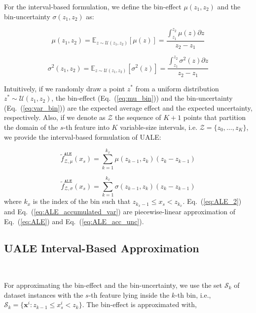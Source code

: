 \documentclass[twoside]{article}
\begin{document}
For the interval-based formulation, we define the bin-effect
\(\mu(z_1, z_2)\) and the bin-uncertainty \(\sigma(z_1, z_2)\) as:

\begin{equation}
  \label{eq:mu_bin}
    \mu(z_1, z_2) = \mathbb{E}_{z \sim \mathcal{U}(z_1,z_2)} [\mu(z)]
    = \frac{\int_{z_1}^{z_2} \mu(z) \partial z}{z_2 - z_1}
\end{equation}

\begin{equation}
  \label{eq:var_bin}
  \sigma^2(z_1, z_2) = \mathbb{E}_{z \sim \mathcal{U}(z_1,z_2)} [\sigma^2(z)] =  \frac{\int_{z_1}^{z_2} \sigma^2(z)  \partial z}{z_2 - z_1}
\end{equation}

%
Intuitively, if we randomly draw a point \(z^*\) from a uniform
distribution \(z^* \sim \mathcal{U}(z_1, z_2)\), the bin-effect
(Eq.~(\ref{eq:mu_bin})) and the bin-uncertainty
(Eq.~(\ref{eq:var_bin})) are the expected average effect and the
expected uncertainty, respectively. Also, if we denote as
\(\mathcal{Z}\) the sequence of \(K+1\) points that partition the
domain of the \(s\)-th feature into \(K\) variable-size intervals,
i.e.  \(\mathcal{Z} = \{z_0, \ldots, z_K\}\), we provide the
interval-based formulation of UALE:

\begin{equation}
  \label{eq:ALE_2}
  \tilde{f}^{\mathtt{ALE}}_{\mathcal{Z}, \mu}(x_s) = \sum_{k=1}^{k_x} \mu(z_{k-1}, z_k) (z_k - z_{k-1})
\end{equation}

\begin{equation}
  \label{eq:ALE_accumulated_var}
  \tilde{f}^{\mathtt{ALE}}_{\mathcal{Z}, \sigma}(x_s) =  \sum_{k=1}^{k_x} \sigma(z_{k-1}, z_k) (z_k - z_{k-1})
\end{equation}
%
where \(k_x\) is the index of the bin such that
\( z_{k_x - 1} \leq x_s < z_{k_x}\). Eq.~(\ref{eq:ALE_2}) and
Eq.~(\ref{eq:ALE_accumulated_var}) are piecewise-linear approximation
of Eq.~(\ref{eq:ALE}) and Eq.~(\ref{eq:ALE_acc_unc}).

\subsection{UALE Interval-Based Approximation}
~\label{sec:UALE-approximation}

For approximating the bin-effect and the bin-uncertainty, we use the
set \(\mathcal{S}_k\) of dataset instances with the \(s\)-th feature
lying inside the \(k\)-th bin, i.e.,
\( \mathcal{S}_k= \{ \mathbf{x}^i : z_{k-1} \leq x^i_s < z_k \}
\). The bin-effect is approximated with,
\end{document}

